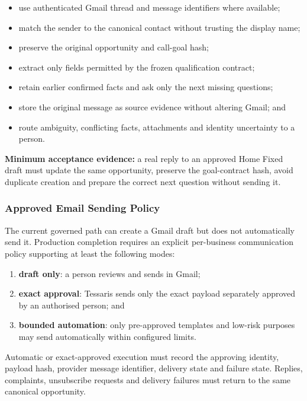 \begin{itemize}[leftmargin=*]
  \item use authenticated Gmail thread and message identifiers where available;
  \item match the sender to the canonical contact without trusting the display name;
  \item preserve the original opportunity and call-goal hash;
  \item extract only fields permitted by the frozen qualification contract;
  \item retain earlier confirmed facts and ask only the next missing questions;
  \item store the original message as source evidence without altering Gmail; and
  \item route ambiguity, conflicting facts, attachments and identity uncertainty to a person.
\end{itemize}

\textbf{Minimum acceptance evidence:} a real reply to an approved Home Fixed
draft must update the same opportunity, preserve the goal-contract hash, avoid
duplicate creation and prepare the correct next question without sending it.

\subsubsection{Approved Email Sending Policy}

The current governed path can create a Gmail draft but does not automatically
send it.  Production completion requires an explicit per-business communication
policy supporting at least the following modes:

\begin{enumerate}[leftmargin=*]
  \item \textbf{draft only}: a person reviews and sends in Gmail;
  \item \textbf{exact approval}: Tessaris sends only the exact payload separately approved by an authorised person; and
  \item \textbf{bounded automation}: only pre-approved templates and low-risk purposes may send automatically within configured limits.
\end{enumerate}

Automatic or exact-approved execution must record the approving identity,
payload hash, provider message identifier, delivery state and failure state.
Replies, complaints, unsubscribe requests and delivery failures must return to
the same canonical opportunity.

